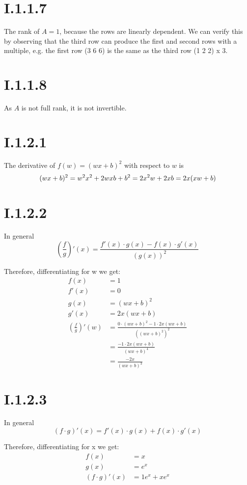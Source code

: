 \section*{I.1.1.7}
The rank of $A = 1$, because the rows are linearly dependent. We can verify this by observing
that the third row can produce the first and second rows with a multiple, e.g. the first row (3 6 6)
is the same as the third row (1 2 2) x 3.

\section*{I.1.1.8}
As $A$ is not full rank, it is not invertible.

\section*{I.1.2.1}
The derivative of $f(w) = (wx + b)^2$ with respect to $w$ is
\[
	(wx+b)^2 = w^2 x^2 + 2wxb+b^2 = \\
	2x^2w + 2xb = \\
	2x(xw + b)
\]

\section*{I.1.2.2}
In general
\[
	\left ( \frac{f}{g} \right )' (x) = \frac{f'(x) \cdot g(x) - f(x) \cdot g'(x)}{(g(x))^2}
\]

Therefore, differentiating for w we get:
\begin{align*}
	f(x) &= 1 \\
	f'(x) &= 0 \\
	g(x) &= (wx+b)^2 \\
	g'(x) &= 2x(wx+b) \\
	\left ( \frac{f}{g} \right )' (w) &= \frac{0 \cdot (wx+b)^2 - 1 \cdot 2x(wx+b)}{((wx+b)^2)^2} \\
	&= \frac{-1 \cdot 2x(wx+b)}{(wx+b)^4} \\
	&= \frac{-2x}{(wx+b)^3}
\end{align*}

\section*{I.1.2.3}
In general
\[
	\left ( f \cdot g \right )' (x) = f'(x) \cdot g(x) + f(x) \cdot g'(x)
\]

Therefore, differentiating for x we get:
\begin{align*}
	f(x) &= x \\
	g(x) &= e^x \\
	\left ( f \cdot g \right )' (x) &= 1e^x + xe^x
\end{align*}

